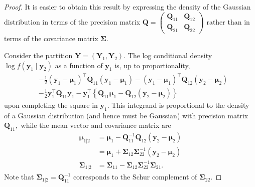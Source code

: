 \documentclass[
  11pt,
  letterpaper,
]{scrbook}
\theoremstyle{definition}
\theoremstyle{plain}
\theoremstyle{plain}
\theoremstyle{plain}
\theoremstyle{definition}
\theoremstyle{definition}
\theoremstyle{plain}
\theoremstyle{plain}
\theoremstyle{remark}
\begin{document}
\begin{proof}
It is easier to obtain this result by expressing the density of the
Gaussian distribution in terms of the precision matrix
\(\boldsymbol{Q}= \left(\begin{smallmatrix}\boldsymbol{Q}_{11} & \boldsymbol{Q}_{12}\\
\boldsymbol{Q}_{21} & \boldsymbol{Q}_{22}\end{smallmatrix}\right)\)
rather than in terms of the covariance matrix \(\boldsymbol{\Sigma}.\)

Consider the partition
\(\boldsymbol{Y}=(\boldsymbol{Y}_1, \boldsymbol{Y}_2).\) The log
conditional density \(\log f(\boldsymbol{y}_1 \mid \boldsymbol{y}_2)\)
as a function of \(\boldsymbol{y}_1\) is, up to proportionality,
\begin{align*}
 &-\frac{1}{2}\left(\boldsymbol{y}_1-\boldsymbol{\mu}_1\right)^\top
\boldsymbol{Q}_{11}\left(\boldsymbol{y}_1-\boldsymbol{\mu}_1\right) - \left(\boldsymbol{y}_1-\boldsymbol{\mu}_1\right)^\top 
\boldsymbol{Q}_{12}\left(\boldsymbol{y}_2-\boldsymbol{\mu}_2\right)\\
&-\frac{1}{2}\boldsymbol{y}_1^\top\boldsymbol{Q}_{11}\boldsymbol{y}_1-\boldsymbol{y}_1^\top
\left\{\boldsymbol{Q}_{11}\boldsymbol{\mu}_1-\boldsymbol{Q}_{12}\left(\boldsymbol{y}_2-\boldsymbol{\mu}_2\right)\right\}
\end{align*} upon completing the square in \(\boldsymbol{y}_1.\) This
integrand is proportional to the density of a Gaussian distribution (and
hence must be Gaussian) with precision matrix \(\boldsymbol{Q}_{11},\)
while the mean vector and covariance matrix are \begin{align*}
\boldsymbol{\mu}_{1|2} &= 
\boldsymbol{\mu}_1-\boldsymbol{Q}_{11}^{-1}\boldsymbol{Q}_{12}  \left(\boldsymbol{y}_2-\boldsymbol{\mu}_2\right)
\\&=\boldsymbol{\mu}_1+ \boldsymbol{\Sigma}_{12}\boldsymbol{\Sigma}_{22}^{-1}\left(\boldsymbol{y}_2-\boldsymbol{\mu}_2\right)
\\\boldsymbol{\Sigma}_{1|2} &= \boldsymbol{\Sigma}_{11}-\boldsymbol{\Sigma}_{12}\boldsymbol{\Sigma}_{22}^{-1}\boldsymbol{\Sigma}_{21}.
\end{align*} Note that
\(\boldsymbol{\Sigma}_{1|2}=\boldsymbol{Q}_{11}^{-1}\) corresponds to
the Schur complement of \(\boldsymbol{\Sigma}_{22}.\)


\end{proof}
\end{document}
